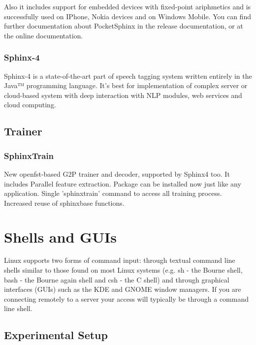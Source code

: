 \documentclass[12pt,a4paper,oneside]{memoir}
\begin{document}
Also it includes support for embedded devices with fixed-point ariphmetics and is successfully used on IPhone, Nokia devices and on Windows Mobile. You can find further documentation about PocketSphinx in the release documentation, or at the online  documentation. 

\subsubsection{Sphinx-4}
Sphinx-4 is a state-of-the-art part of speech tagging system written entirely in the Java™ programming language. It's best for implementation of complex server or cloud-based system with deep interaction with NLP modules, web services and cloud computing.

\subsection{Trainer}
\subsubsection{SphinxTrain}
 New openfst-based G2P trainer and decoder, supported by Sphinx4 too. It includes Parallel feature extraction.  Package can be installed now just like any application. Single 'sphinxtrain' command to access all training process. Increased reuse of sphinxbase functions.

\section{Shells and GUIs}
Linux supports two forms of command input: through textual command line shells similar to those found on most Linux systems (e.g. sh - the Bourne shell, bash - the Bourne again shell and csh - the C shell) and through graphical interfaces (GUIs) such as the KDE and GNOME window managers. If you are connecting remotely to a server your access will typically be through a command line shell.\\




\subsection{Experimental Setup}
\end{document}
